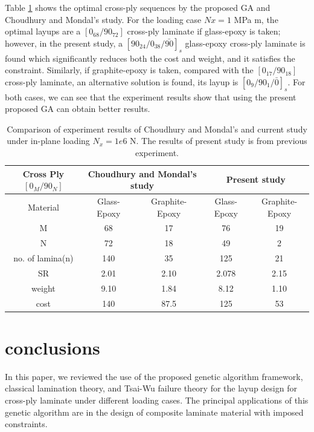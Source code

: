 \documentclass[10pt, journal]{IEEEtran}
\begin{document}
Table \ref{tab:comparsion} shows the optimal cross-ply sequences by the
proposed GA and  Choudhury and Mondal's\cite{choudhury2019failure} study. For
the loading case $Nx=1$ MPa m, the optimal layups are a $[0_{68}/90_{72}]$
cross-ply laminate if glass-epoxy is taken; however, in the present study, a
$[90_{24}/0_{38}/\bar{90}]_s$ glass-epoxy cross-ply laminate is found which
significantly reduces both the cost and weight, and it satisfies the
constraint.  Similarly, if graphite-epoxy is taken, compared with the
$[0_{17}/90_{18}]$ cross-ply laminate, an alternative solution is found,
its layup is $[0_{9}/90_{1}/\bar{0}]_s$. For both cases, we can see that the
experiment results show that using the present proposed GA can obtain better
results.

\begin{table}[t]
\caption{Comparison of experiment results of Choudhury and
Mondal's\cite{choudhury2019failure} and current study under in-plane loading
$N_x=1e6$ N. The results of present study is from previous experiment.}
\centering
\begin{adjustbox}{width=0.5\textwidth}
	\begin{tabular}{c|cc|cc}
		\toprule
		Cross Ply $[0_M/90_N]$         & \multicolumn{2}{c}{Choudhury and Mondal's study} & \multicolumn{2}{c}{Present study} \\
		\midrule																								  
		 Material       &  Glass-Epoxy & Graphite-Epoxy  & Glass-Epoxy & Graphite-Epoxy      \\ 
			  M         &  68          &    17           &  76		    &  19             \\
			  N         &  72          &    18           &  49		    &  2              \\
	no. of lamina(n)    &  140         &    35           &  125	        &  21                     \\
			 SR         &  2.01        &    2.10         &  2.078	    &  2.15            \\
		 weight         &  9.10        &    1.84         &  8.12	    &  1.10           \\
		 cost           &  140         &    87.5         &  125	        &  53           \\
		\bottomrule
	\end{tabular}
\end{adjustbox}
\label{tab:comparsion}
\end{table}

\section{conclusions}
In this paper, we reviewed the use of the proposed genetic algorithm framework, classical lamination theory, and Tsai-Wu failure theory for the layup design for cross-ply laminate under different loading cases. The principal applications of this genetic algorithm are in the design of composite laminate material with imposed constraints.
\end{document}

